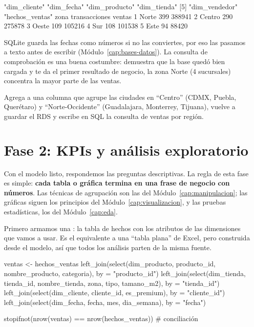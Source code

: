 \begin{rsalida}
[1] "dim_cliente"   "dim_fecha"     "dim_producto"  "dim_tienda"   
[5] "dim_vendedor"  "hechos_ventas"
    zona transacciones ventas
1  Norte           399 388941
2 Centro           290 275878
3  Oeste           109 105216
4    Sur           108 101538
5   Este            94  88420
\end{rsalida}

SQLite guarda las fechas como números si no las conviertes, por eso las
pasamos a texto antes de escribir (Módulo~\ref{cap:bases-datos}). La consulta
de comprobación es una buena costumbre: demuestra que la base quedó bien
cargada y te da el primer resultado de negocio, la zona Norte (4 sucursales)
concentra la mayor parte de las ventas.

\begin{hazlotu}
Agrega a  una columna  que agrupe las
ciudades en ``Centro'' (CDMX, Puebla, Querétaro) y ``Norte-Occidente''
(Guadalajara, Monterrey, Tijuana), vuelve a guardar el RDS y escribe en SQL
la consulta de ventas por región.
\end{hazlotu}

\section{Fase 2: KPIs y análisis exploratorio}
\label{sec:m09-kpis}

Con el modelo listo, respondemos las preguntas descriptivas. La regla de esta
fase es simple: \textbf{cada tabla o gráfica termina en una frase de negocio
con números}. Las técnicas de agrupación son las del
Módulo~\ref{cap:manipulacion}; las gráficas siguen los principios del
Módulo~\ref{cap:visualizacion}, y las pruebas estadísticas, los del
Módulo~\ref{cap:eda}.

Primero armamos una : la tabla de hechos con los
atributos de las dimensiones que vamos a usar. Es el equivalente a una
``tabla plana'' de Excel, pero construida desde el modelo, así que todos los
análisis parten de la misma fuente.

\begin{rcode}
ventas <- hechos_ventas %
  left_join(select(dim_producto, producto_id, nombre_producto,
                   categoria), by = "producto_id") %
  left_join(select(dim_tienda, tienda_id, nombre_tienda, zona, tipo,
                   tamano_m2), by = "tienda_id") %
  left_join(select(dim_cliente, cliente_id, es_premium),
            by = "cliente_id") %
  left_join(select(dim_fecha, fecha, mes, dia_semana), by = "fecha")

stopifnot(nrow(ventas) == nrow(hechos_ventas))   # conciliación
\end{rcode}

